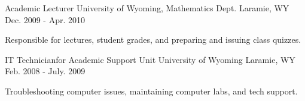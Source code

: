 \begin{cventries}

\cventry
{Academic Lecturer} %
{University of Wyoming, Mathematics Dept.} %
{Laramie, WY} %
{Dec. 2009 - Apr. 2010} %
{ %
\begin{cvitems}
\item {Responsible for lectures, student grades, and preparing and issuing class quizzes.}
\end{cvitems}
}


\cventry
{IT Technicianfor Academic Support Unit} %
{University of Wyoming} %
{Laramie, WY} %
{Feb. 2008 - July. 2009} %
{ %
\begin{cvitems}
\item {Troubleshooting computer issues, maintaining computer labs, and tech support.}
\end{cvitems}
}


\end{cventries}